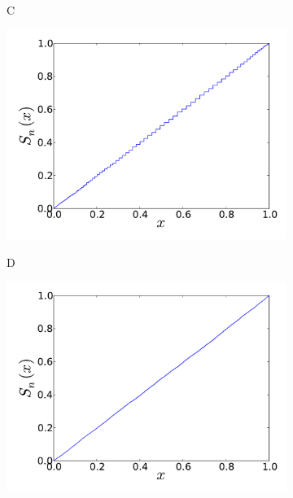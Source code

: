 \begin{figure}[h]
\begin{subfigure}[b]{0.49\textwidth}
    \label{subfig:RCC_distinct_B}
\end{subfigure}
\\
\begin{subfigure}[b]{0.49\textwidth}
	  \begin{flushleft}
	  \large C
		\end{flushleft}
    \centering
    \includegraphics[width=\textwidth]{RCC_distinct_C.pdf}
    \label{subfig:RCC_distinct_C}
\end{subfigure}
\begin{subfigure}[b]{0.49\textwidth}
	  \begin{flushleft}
	  \large D
		\end{flushleft}
    \centering
    \includegraphics[width=\textwidth]{RCC_distinct_D.pdf}

\end{subfigure}
\end{figure}
